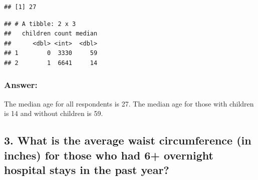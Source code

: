 \documentclass[]{article}
\newenvironment{Shaded}{\begin{snugshade}}{\end{snugshade}}
\newcommand{\DataTypeTok}[1]{\textcolor[rgb]{0.13,0.29,0.53}{#1}}
\newcommand{\KeywordTok}[1]{\textcolor[rgb]{0.13,0.29,0.53}{\textbf{#1}}}
\newcommand{\NormalTok}[1]{#1}
\newcommand{\OperatorTok}[1]{\textcolor[rgb]{0.81,0.36,0.00}{\textbf{#1}}}
\newcommand{\OtherTok}[1]{\textcolor[rgb]{0.56,0.35,0.01}{#1}}
\newcommand{\StringTok}[1]{\textcolor[rgb]{0.31,0.60,0.02}{#1}}
\begin{document}
\begin{Shaded}
\end{Shaded}

\begin{verbatim}
## [1] 27
\end{verbatim}

\begin{Shaded}
\end{Shaded}

\begin{verbatim}
## # A tibble: 2 x 3
##   children count median
##      <dbl> <int>  <dbl>
## 1        0  3330     59
## 2        1  6641     14
\end{verbatim}

\hypertarget{answer-1}{%
\subsubsection{Answer:}\label{answer-1}}

The median age for all respondents is 27. The median age for those with
children is 14 and without children is 59.

\hypertarget{what-is-the-average-waist-circumference-in-inches-for-those-who-had-6-overnight-hospital-stays-in-the-past-year}{%
\subsection{3. What is the average waist circumference (in inches) for
those who had 6+ overnight hospital stays in the past
year?}\label{what-is-the-average-waist-circumference-in-inches-for-those-who-had-6-overnight-hospital-stays-in-the-past-year}}

\begin{Shaded}
\end{Shaded}
\end{document}
